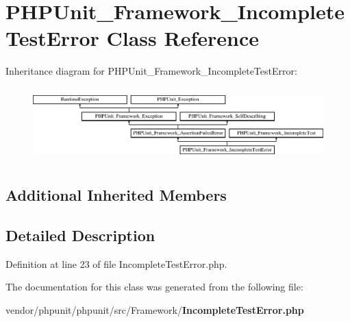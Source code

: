 \section{P\+H\+P\+Unit\+\_\+\+Framework\+\_\+\+Incomplete\+Test\+Error Class Reference}
\label{class_p_h_p_unit___framework___incomplete_test_error}
Inheritance diagram for P\+H\+P\+Unit\+\_\+\+Framework\+\_\+\+Incomplete\+Test\+Error\+:\begin{figure}[H]
\begin{center}
\leavevmode
\includegraphics[height=2.860792cm]{class_p_h_p_unit___framework___incomplete_test_error}
\end{center}
\end{figure}
\subsection*{Additional Inherited Members}


\subsection{Detailed Description}


Definition at line 23 of file Incomplete\+Test\+Error.\+php.



The documentation for this class was generated from the following file\+:\begin{DoxyCompactItemize}
\item 
vendor/phpunit/phpunit/src/\+Framework/{\bf Incomplete\+Test\+Error.\+php}\end{DoxyCompactItemize}
